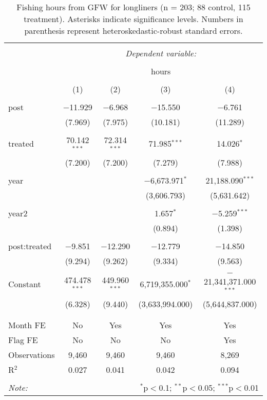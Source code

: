 \documentclass[12pt,]{article}
\begin{document}
\begin{table}[!htbp] \centering 
  \caption{\label{tab:long}Fishing hours from GFW for longliners (n = 203; 88 control, 115 treatment). Asterisks indicate significance levels. Numbers in parenthesis represent heteroskedastic-robust standard errors.} 
  \label{} 
\begin{tabular}{@{\extracolsep{5pt}}lcccc} 
\\[-1.8ex]\hline 
\hline \\[-1.8ex] 
 & \multicolumn{4}{c}{\textit{Dependent variable:}} \\ 
\cline{2-5} 
\\[-1.8ex] & \multicolumn{4}{c}{hours} \\ 
\\[-1.8ex] & (1) & (2) & (3) & (4)\\ 
\hline \\[-1.8ex] 
 post & $-$11.929 & $-$6.968 & $-$15.550 & $-$6.761 \\ 
  & (7.969) & (7.975) & (10.181) & (11.289) \\ 
  & & & & \\ 
 treated & 70.142$^{***}$ & 72.314$^{***}$ & 71.985$^{***}$ & 14.026$^{*}$ \\ 
  & (7.200) & (7.200) & (7.279) & (7.988) \\ 
  & & & & \\ 
 year &  &  & $-$6,673.971$^{*}$ & 21,188.090$^{***}$ \\ 
  &  &  & (3,606.793) & (5,631.642) \\ 
  & & & & \\ 
 year2 &  &  & 1.657$^{*}$ & $-$5.259$^{***}$ \\ 
  &  &  & (0.894) & (1.398) \\ 
  & & & & \\ 
 post:treated & $-$9.851 & $-$12.290 & $-$12.779 & $-$14.850 \\ 
  & (9.294) & (9.262) & (9.334) & (9.563) \\ 
  & & & & \\ 
 Constant & 474.478$^{***}$ & 449.960$^{***}$ & 6,719,355.000$^{*}$ & $-$21,341,371.000$^{***}$ \\ 
  & (6.328) & (9.440) & (3,633,994.000) & (5,644,837.000) \\ 
  & & & & \\ 
\hline \\[-1.8ex] 
Month FE & No & Yes & Yes & Yes \\ 
Flag FE & No & No & No & Yes \\ 
Observations & 9,460 & 9,460 & 9,460 & 8,269 \\ 
R$^{2}$ & 0.027 & 0.041 & 0.042 & 0.094 \\ 
\hline 
\hline \\[-1.8ex] 
\textit{Note:}  & \multicolumn{4}{r}{$^{*}$p$<$0.1; $^{**}$p$<$0.05; $^{***}$p$<$0.01} \\ 
\end{tabular} 
\end{table}
\end{document}
